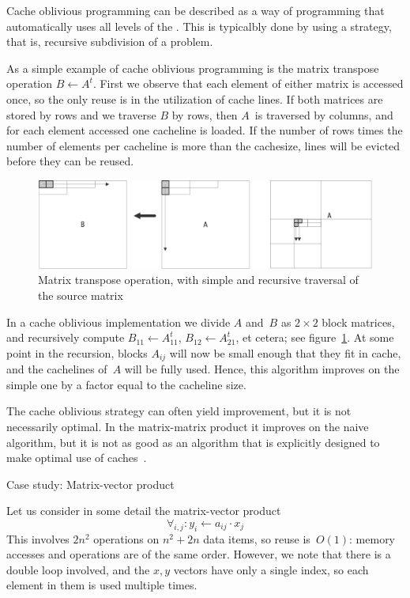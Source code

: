Cache oblivious programming can be described as a way of programming
that automatically uses all levels of the
. This is typicalbly done by using a
 strategy, that is, recursive
subdivision of a problem.

As a simple example of cache oblivious programming is the matrix
transpose operation $B\leftarrow A^t$. First we observe that each
element of either matrix is accessed once, so the only reuse is in the
utilization of cache lines. If both matrices are stored by
rows and we traverse $B$ by rows, then $A$~is traversed by columns,
and for each element accessed one cacheline is loaded. If the number
of rows times the number of elements per cacheline is more than the
cachesize, lines will be evicted before they can be reused.

\begin{figure}[ht]
  \includegraphics[scale=.1]{graphics-public/oblivious1}
  \caption{Matrix transpose operation, with simple and recursive
    traversal of the source matrix}
  \label{fig:oblivious-transpose}
\end{figure}
In a cache oblivious implementation we divide $A$ and~$B$ as
$2\times2$ block matrices, and recursively compute $B_{11}\leftarrow
A_{11}^t$, $B_{12}\leftarrow A_{21}^t$, et cetera; see
figure~\ref{fig:oblivious-transpose}. At some point in the recursion,
blocks $A_{ij}$ will now be small enough that they fit in cache, and
the cachelines of~$A$ will be fully used. Hence, this algorithm
improves on the simple one by a factor equal to the cacheline size.

The cache oblivious strategy can often yield improvement, but it is
not necessarily optimal. In the matrix-matrix product it improves on
the naive algorithm, but it is not as good as an algorithm that is
explicitly designed to make optimal use of
caches~\cite{GotoGeijn:2008:Anatomy}.


 {Case study: Matrix-vector product}
\label{sec:mvp-opt}

Let us consider in some detail
the matrix-vector product
\[ \forall_{i,j}\colon y_i\leftarrow a_{ij}\cdot x_j \] This involves $2n^2$
operations on $n^2+2n$ data items, so reuse is~$O(1)$: memory accesses
and operations are of the same order. However, we note that there is a
double loop involved, and the $x,y$ vectors have only a single index,
so each element in them is used multiple times.

